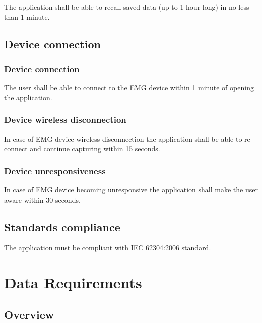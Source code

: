 \documentclass[12pt,a4paper]{article}
\begin{document}
The application shall be able to recall saved data (up to 1 hour long) in no less than 1 minute.

\subsection{Device connection}

\subsubsection{Device connection}

The user shall be able to connect to the EMG device within 1 minute of opening the application.

\subsubsection{Device wireless disconnection}

In case of EMG device wireless disconnection the application shall be able to re-connect and continue capturing within 15 seconds.

\subsubsection{Device unresponsiveness}

In case of EMG device becoming unresponsive the application shall make the user aware within 30 seconds.

\subsection{Standards compliance}

The application must be compliant with IEC 62304:2006 standard.

\newpage

\section{Data Requirements}

\subsection{Overview}
\end{document}
